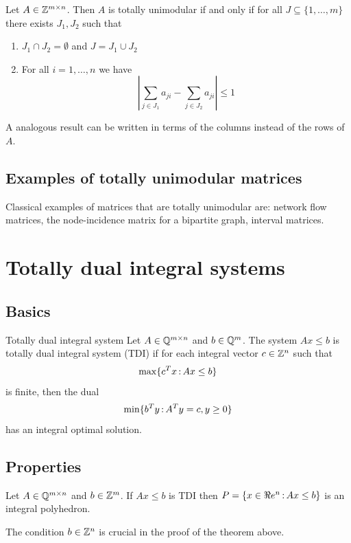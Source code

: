 \begin{theorem}{}{}
Let  $A\in{\mathbb{Z}}^{m\times n}$. Then $A$ is totally unimodular if and only if for all $J\subseteq\{1,\dots,m\}$ there exists $J_1,J_2$ such that
\begin{enumerate}
	\item $J_1\cap J_2=\emptyset$ and $J=J_1\cup J_2$
	\item For all $i=1,\dots,n$ we have 
	$$\left|\sum_{j\in J_1}a_{ji}-\sum_{j\in J_2}a_{ji}\right|\leq 1$$
\end{enumerate}
\end{theorem}

\begin{remark}{}{} A analogous result can be written in terms of the columns instead of the rows of  $A$.
\end{remark}

\subsection{Examples of totally unimodular matrices}

Classical examples of matrices that are totally unimodular are: network flow matrices, the node-incidence matrix for a bipartite graph, interval matrices.

\section{Totally dual integral systems}

 \subsection{Basics}

\begin{definition}{Totally dual integral system}{}
Let $A\in{\mathbb{Q}}^{m\times n}$ and $b\in{\mathbb{Q}}^m$. The system $Ax\leq b$ is totally dual integral system (TDI) if for each integral vector $c\in{\mathbb{Z}}^n$ such that
$$\max\{c^Tx{\,:\,} Ax\leq b\}$$ 
is finite, then the dual
$$\min\{b^Ty{\,:\,} A^Ty=c, y\geq 0\}$$
has an integral optimal solution. 
\end{definition}


 \subsection{Properties}

\begin{theorem}{}{}
Let $A\in{\mathbb{Q}}^{m\times n}$ and $b\in{\mathbb{Z}}^m$. If $Ax\leq b$ is TDI then $P=\{x\in\Re e^n{\,:\,} Ax\leq b\}$
 is an integral polyhedron.
\end{theorem}
\begin{remark}{}{} The condition $b\in{\mathbb{Z}}^n$ is crucial in the proof of the theorem above.
\end{remark}

